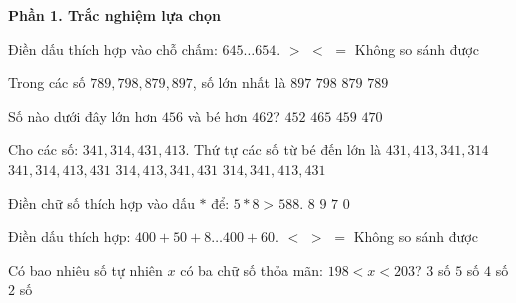 \textbf{Phần 1. Trắc nghiệm lựa chọn}

\begin{ex} %
Điền dấu thích hợp vào chỗ chấm: $645 \dots 654$.
\choice
{$>$}
{\True $<$}
{$=$}
{Không so sánh được}
\end{ex}

\begin{ex} %
Trong các số $789, 798, 879, 897$, số lớn nhất là
\choice
{\True $897$}
{$798$}
{$879$}
{$789$}
\end{ex}

\begin{ex} %
Số nào dưới đây lớn hơn $456$ và bé hơn $462$?
\choice
{$452$}
{$465$}
{\True $459$}
{$470$}
\end{ex}

\begin{ex} %
Cho các số: $341, 314, 431, 413$. Thứ tự các số từ bé đến lớn là
\choice
{$431, 413, 341, 314$}
{$341, 314, 413, 431$}
{$314, 413, 341, 431$}
{\True $314, 341, 413, 431$}
\end{ex}

\begin{ex} %
Điền chữ số thích hợp vào dấu $*$ để: $5*8 > 588$.
\choice
{$8$}
{\True $9$}
{$7$}
{$0$}
\end{ex}

\begin{ex} %
Điền dấu thích hợp: $400 + 50 + 8 \dots 400 + 60$.
\choice
{\True $<$}
{$>$}
{$=$}
{Không so sánh được}
\end{ex}

\begin{ex} %
Có bao nhiêu số tự nhiên $x$ có ba chữ số thỏa mãn: $198 < x < 203$?
\choice
{$3$ số}
{$5$ số}
{\True $4$ số}
{$2$ số}
\end{ex}

